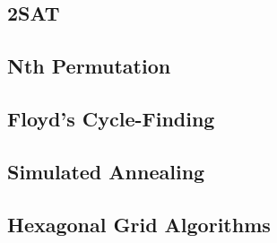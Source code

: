 \documentclass[8pt,a4paper,landscape,oneside]{amsart}
\begin{document}
\begin{multicols*}{3}
	\subsection{2SAT}
	\subsection{Nth Permutation}
	\subsection{Floyd's Cycle-Finding}
	\subsection{Simulated Annealing}
	\subsection{Hexagonal Grid Algorithms}

\clearpage



\end{multicols*}
\end{document}
